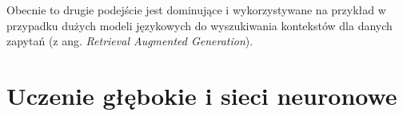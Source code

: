\documentclass{myclass}
\numberwithin{equation}{section}
\begin{document}
Obecnie to drugie podejście jest dominujące i wykorzystywane na przykład w przypadku dużych modeli
językowych do wyszukiwania kontekstów dla danych zapytań (z ang. \textit{Retrieval Augmented
Generation}).



\section{Uczenie głębokie i sieci neuronowe}

    
\end{document}
